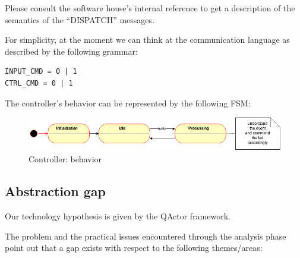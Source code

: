 \documentclass{article}
\newcommand{\mycolor}{myrgb}
\newcommand{\colorize}[1]{{\color{\mycolor}#1}}
\begin{document}
Please consult the software house's internal reference to get a description of
the semantics of the ``DISPATCH'' messages.



For simplicity, at the moment we can think at the communication language as
described by the following grammar:

\begin{lstlisting}
INPUT_CMD = 0 | 1
CTRL_CMD = 0 | 1
\end{lstlisting}

The controller's behavior can be represented by the following FSM:

\begin{figure}[H]
    \centering
     \includegraphics[scale=0.65]{img/ISS-FSM-Controller.png}
    \caption{Controller: behavior}
\end{figure}



\subsection{Abstraction gap}

\colorize{Our technology hypothesis is given by the QActor framework.}

The problem and the practical issues encountered through the analysis phase
point out that a gap exists with respect to the following themes/areas:
\end{document}
